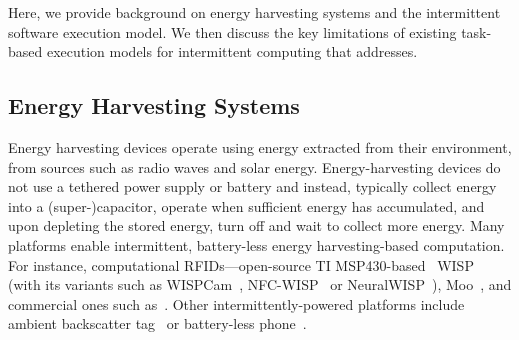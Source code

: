 Here, we provide background on energy harvesting systems and the intermittent software execution model. We then discuss the key limitations of existing task-based execution models for intermittent computing that \sys addresses.

\subsection{Energy Harvesting Systems}
\label{sec:background_harvesting}

Energy harvesting devices operate using energy extracted from their environment, from sources such as radio waves and solar energy. Energy-harvesting devices do not use a tethered power supply or battery and instead, typically collect energy into a (super-)capacitor, operate when sufficient energy has accumulated, and upon depleting the stored energy, turn off and wait to collect more energy.
%
%
%
Many platforms enable intermittent, battery-less energy harvesting-based computation. For instance, computational RFIDs---open-source TI MSP430-based~\cite{wolverine} WISP~\cite{wisp5} (with its variants such as WISPCam~\cite{naderiparizi_rfid_2015}, NFC-WISP~\cite{zhao_rfid_2015} or NeuralWISP~\cite{holleman_biocas_2008}), Moo~\cite{moo}, and commercial ones such as~\cite{medusa_farsens_2017}. Other intermittently-powered platforms include ambient backscatter tag~\cite{liu_sigcomm_2013,parks_sigcomm_2014} or battery-less phone~\cite{talla_imwut_2017}. 

